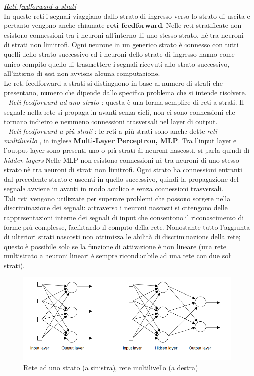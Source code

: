 \documentclass[12pt,a4paper,oneside]{book}
\begin{document}
			\underline{\emph{Reti feedforward a strati}}\\
		In queste reti i segnali viaggiano dallo strato di ingresso verso lo strato di uscita e pertanto vengono anche chiamate \textbf{reti feedforward}. Nelle reti stratificate non esistono connessioni tra i neuroni all'interno di uno stesso strato, nè tra neuroni di strati non limitrofi. Ogni neurone in un generico strato è connesso con tutti quelli dello strato successivo ed i neuroni dello strato di ingresso hanno come unico compito quello di trasmettere i segnali ricevuti allo strato successivo, all'interno di essi non avviene alcuna computazione.\\
		Le reti feedforward a strati si distinguono in base al numero di strati che presentano, numero che dipende dallo specifico problema che si intende risolvere.\\ 
		- \emph{Reti feedforward ad uno strato} : questa è una forma semplice di reti a strati. Il segnale nella rete si propaga in avanti senza cicli, non ci sono connessioni che tornano indietro e nemmeno connessioni trasversali nel layer di output.\\
		- \emph{Reti feedforward a più strati }: le reti a più strati sono anche dette \textit{reti multilivello }, in inglese \textbf{\textit{}Multi-Layer Perceptron, MLP}. Tra l'input layer e l'output layer sono presenti uno o più strati di neuroni nascosti, si parla quindi di \textit{\textit{hidden layers}} Nelle MLP non esistono connessioni nè tra neuroni di uno stesso strato nè tra neuroni di strati non limitrofi. Ogni strato ha connessioni entranti dal precedente strato e uscenti in quello successivo, quindi la propagazione del segnale avviene in avanti in modo aciclico e senza connessioni trasversali.\\
		Tali reti vengono utilizzate per superare problemi che possono sorgere nella discriminazione dei segnali: attraverso i neuroni nascosti si ottengono delle rappresentazioni interne dei segnali di input che consentono il riconoscimento di forme più complesse, facilitando il compito della rete. 
		Nonostante tutto l’aggiunta di ulteriori strati nascosti non ottimizza le abilità di discriminazione della rete; questo è possibile solo se la funzione di attivazione è non lineare (una rete multistrato a neuroni lineari è sempre riconducibile ad una rete con due soli strati).\\ 
		
		\begin{figure}[h]
			\centering
			\includegraphics[width=0.9\linewidth]{IMMAGINI/unostrato}
			\caption{Rete ad uno strato (a sinistra), rete multilivello (a destra)}
			\label{fig:multistrato}
		\end{figure}
	
\end{document}
